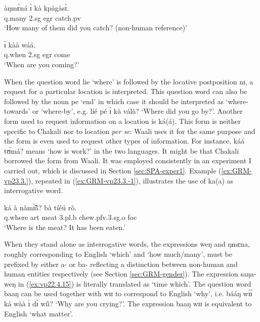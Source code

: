 \begin{exe}
\begin{exe}
\begin{exe}
{\begin{exe}
\begin{exe}
\begin{exe}
\begin{exe}
\begin{exe}
\begin{exe}
\begin{exe}
\ex\label{ex:vp22.4.10}
\gll àŋmɛ̀ná ɪ̀ kà kpàgàsɪ̀.\\
   {\sc q}.many {\sc 2.sg}  {\sc  egr}  catch.{\sc pv}\\
\glt  `How many of them did you catch? (non-human reference)' 

\ex\label{ex:vp22.4.15}
 ɪ̀ kàà wáá.\\
    {\sc q}.when {\sc 2.sg} {\sc  egr} come\\
\glt  `When are you coming?' 
  
   
  \z 
 \z


When the question word {\sls lie} `where' is  followed by the locative 
postposition {\sls nɪ},  a request for a particular location is interpreted. 
This 
question word can also be followed by the noun  {\sls pe} `end' in which case 
it 
should be interpreted as `where-towards' or `where-by', e.g. {\sls líé pé ɪ̀ kà 
válà?} `Where did you go by?'.  Another form used to request information on a 
location is {\sls ká(á)}. This form is neither specific to Chakali nor to 
location {\it per se}:  Waali uses it for the same 
purpose and the form is even used to request other types  of information. For 
instance, {\sls káá tʊ́má?} means `how is work?' in the two languages. It 
might be that Chakali borrowed the form from Waali.  It was employed 
consistently in an experiment I carried out, which is discussed  in Section 
\ref{sec:SPA-exper1}. Example  (\ref{ex:GRM-vp23.3.}),  repeated in  
(\ref{ex:GRM-vp23.3.-1}), illustrates the use of {\sls ka(a)} as interrogative 
word.



\begin{exe}
\ex\label{ex:GRM-vp23.3.-1}
\gll ká à nàmɪ̃̀ã́?  bà tíéú rò.\\
   {\sc q}.where {\sc art} meat {\sc 3.pl.b} chew.{\sc pfv}.{\sc 3.sg.o} {\sc
foc}\\
\glt  `Where is the meat? It has been eaten.'

\end{exe}





When they stand alone as interrogative words, the
expressions {\sls weŋ} and {\sls ŋmɛna}, roughly
corresponding to English `which' and `how much/many', must be prefixed by either
{\sls a-} or {\sls ba-} reflecting a distinction between non-human and human 
entities respectively (see Section \ref{sec:GRM-gender}). The expression {\sls 
saŋa-weŋ} in (\ref{ex:vp22.4.15}) is
literally translated as `time which'.  The question word {\sls baaŋ} can be 
used together with {\sls wɪɪ} to correspond to English `why', i.e.
{\sls bááŋ wɪ́ɪ́ ká wàà ɪ̀ dɪ̀ wíì?}  `Why are you crying?'.  The expression {\sls 
baaŋ
wɪɪ} is equivalent to English `what matter'. 






\end{exe}
\end{exe}
\end{exe}
\end{exe}
\end{exe}
\end{exe}
\end{exe}}
\end{exe}
\end{exe}
\end{exe}
